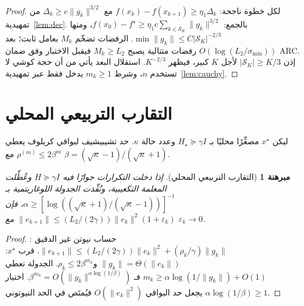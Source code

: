 \documentclass[12pt,a4paper]{article}
\newtheorem{theorem}{مبرهنة}
\theoremstyle{definition}
\begin{document}
\begin{proof}
لكل خطوة ناجحة: $f(x_k)-f(x_{k+1})\ge\eta_1\Delta_k$ مع
$\Delta_k\ge c\|g_k\|^{3/2}$ من تمهيدية~\ref{lem:dec}. بالجمع:
$f(x_0)-f^\star\ge\eta_1 c\sum_{k\in\mathcal{S}_K}\|g_k\|^{3/2}$،
ومنها
$\min\|g_k\|\le C|\mathcal{S}_K|^{-2/3}$.
الرفضات تضخّم $M_k$ بعامل ثابت؛ بعد $O(\log(L_2/\sigma_{\min}))$ رفضات
متتالية يصبح $M_k\ge L_2$ فيقبل الاختبار وفق ضمان \textenglish{ARC}.
إذن $|\mathcal{S}_K|\ge K/3$ لأجل $K$ كبير، فيظهر $K^{-2/3}$.
استقلال البعد يأتي من أن حجة كوشي لا تستخدم $n$، وشرط $m_k\ge 1$ يدخل فقط عبر
تمهيدية~\ref{lem:cauchy}.
\end{proof}

\section{التقارب التربيعي المحلي}
ليكن $x^\star$ مصغِّرًا محليًا بـ $H_\star\succeq\gamma I$ وعدد حالة $\kappa$.
حد تشيبيشيف لبواقي كريلوف يعطي $\rho^{(m)}\le 2\beta^m$ مع
$\beta=(\sqrt{\kappa}-1)/(\sqrt{\kappa}+1)$.

\begin{theorem}[التقارب التربيعي المحلي]\label{thm:local}
إذا دخلت التكرارات جوارًا فيه $H\succeq\gamma I$ وعُطِّلت المعلمة التكعيبية،
ونُفِّذت الجدولة اللوغاريتمية بـ
$\alpha\ge[\log((\sqrt{\kappa}+1)/(\sqrt{\kappa}-1))]^{-1}$، فإن
$\|e_{k+1}\|\le(L_2/(2\gamma))\|e_k\|^2(1+\varepsilon_k)$ مع
$\varepsilon_k\to 0$.
\end{theorem}

\begin{proof}
حساب نيوتن غير الدقيق \cite{dembo1982}:
$\|e_{k+1}\|\le(L_2/(2\gamma))\|e_k\|^2+(\rho_k/\gamma)\|g_k\|$.
قرب $x^\star$: $\|g_k\|=\Theta(\|e_k\|)$ و$\rho_k\le 2\beta^{m_k}$.
الجدولة تعطي $m_k\ge\alpha\log(1/\|g_k\|)+O(1)$ فـ
$\beta^{m_k}=O(\|g_k\|^{\alpha\log(1/\beta)})$.
اختيار $\alpha\log(1/\beta)\ge 1$ يجعل حد البواقي $O(\|e_k\|^2)$ فيُمتَص في
الحد النيوتوني.
\end{proof}
\end{document}
